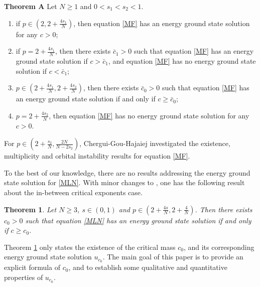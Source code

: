 \documentclass[12pt,a4paper,reqno]{amsart}
\numberwithin{equation}{section}
\newtheorem{theorem}{Theorem}[section]
\begin{document}
\noindent
{\bf Theorem A} \cite[Theorem  1.2]{LuoTJ-Hajaiej2022ANS}
Let $N\geqslant1$ and $0<s_{1}<s_{2}<1$.
\begin{enumerate}
\item
if $p\in(2,2+\frac{4s_{1}}{N})$,
then equation \eqref{MF} has an energy ground state solution for any $c>0$;

\item
if $p=2+\frac{4s_{1}}{N}$,
then there exists $\bar{c}_{1}>0$ such that equation \eqref{MF} has an energy ground state solution if  $c>\bar{c}_{1}$,
and  equation \eqref{MF} has no energy ground state solution if  $c<\bar{c}_{1}$;

\item
$p\in(2+\frac{4s_{1}}{N},2+\frac{4s_{2}}{N})$,
then there exists $\bar{c}_{0}>0$ such that equation \eqref{MF} has an energy ground state solution if and only if $c\geqslant \bar{c}_{0}$;

\item
$p=2+\frac{4s_{2}}{N}$,
then equation \eqref{MF} has no energy ground state solution for any $c>0$.
\end{enumerate}
For $p\in(2+\frac{s_{2}}{N},\frac{2N}{N-2s_{2}})$,
Chergui-Gou-Hajaiej \cite{Chergui-Gou-Hajaiej2023CVPDE} investigated the existence, multiplicity and orbital instability results for equation \eqref{MF}.



To the best of our knowledge,
there are no results addressing the energy ground state solution for \eqref{MLN}.
With minor changes to \cite[Theorems 1.1 and 1.2]{LuoTJ-Hajaiej2022ANS},
one has the following result about the in-between critical exponents case.

\begin{theorem}\label{Theorem1.1}
Let $N\geqslant3$, $s\in(0,1)$ and  $p\in(2+\frac{4s}{N},2+\frac{4}{N})$.
Then there exists $c_{0}>0$ such that equation \eqref{MLN} has an energy ground state solution if and only if $c\geqslant c_{0}$.
\end{theorem}


Theorem \ref{Theorem1.1} only states the existence of the critical mass $c_{0}$, and its corresponding energy ground state solution $u_{c_{0}}$.
The main goal of this paper is to provide an explicit formula of $c_{0}$, and to establish some qualitative and quantitative properties of $u_{c_{0}}$.
\end{document}
